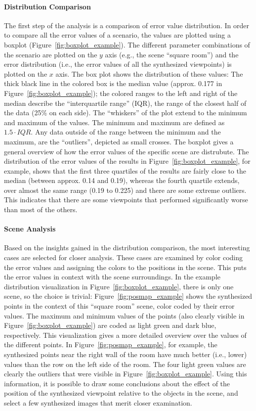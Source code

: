 \paragraph{Distribution Comparison}
The first step of the analysis is a comparison of error value distribution. In order to compare all the error values of a scenario, the values are plotted using a boxplot (Figure~\ref{fig:boxplot_example}). The different parameter combinations of the scenario are plotted on the $y$ axis (e.g., the scene ``square room'') and the error distribution (i.e., the error values of all the synthesized viewpoints) is plotted on the $x$ axis. The box plot shows the distribution of these values: The thick black line in the colored box is the median value (approx. 0.177 in Figure~\ref{fig:boxplot_example}); the colored ranges to the left and right of the median describe the ``interquartile range'' (IQR), the range of the closest half of the data (25\% on each side). The ``whiskers'' of the plot extend to the minimum and maximum of the values. The minimum and maximum are defined as $1.5\cdot IQR$. Any data outside of the range between the minimum and the maximum, are the ``outliers'', depicted as small crosses. The boxplot gives a general overview of how the error values of the specific scene are distrubute. The distribution of the error values of the results in Figure~\ref{fig:boxplot_example}, for example, shows that the first three quartiles of the results are fairly close to the median (between approx. 0.14 and 0.19), whereas the fourth quartile extends, over almost the same range (0.19 to 0.225) and there are some extreme outliers. This indicates that there are some viewpoints that performed significantly worse than most of the others.

\paragraph{Scene Analysis}
Based on the insights gained in the distribution comparison, the most interesting cases are selected for closer analysis. These cases are examined by color coding the error values and assigning the colors to the positions in the scene. This puts the error values in context with the scene surroundings. In the example distribution visualization in Figure~\ref{fig:boxplot_example}, there is only one scene, so the choice is trivial: Figure~\ref{fig:posmap_example} shows the synthesized points in the context of this ``square room'' scene, color coded by their error values. The maximum and minimum values of the points (also clearly visible in Figure~\ref{fig:boxplot_example}) are coded as light green and dark blue, respectively. This visualization gives a more detailed overview over the values of the different points. In Figure~\ref{fig:posmap_example}, for example, the synthesized points near the right wall of the room have much better (i.e., lower) values than the row on the left side of the room. The four light green values are clearly the outliers that were visible in Figure~\ref{fig:boxplot_example}. Using this information, it is possible to draw some conclusions about the effect of the position of the synthesized viewpoint relative to the objects in the scene, and select a few synthesized images that merit closer examination.

